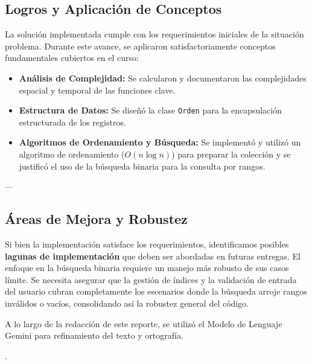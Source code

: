 \documentclass{article}
\begin{document}
\subsection{Logros y Aplicación de Conceptos}
La solución implementada cumple con los requerimientos iniciales de la situación problema. Durante este avance, se aplicaron satisfactoriamente conceptos fundamentales cubiertos en el curso:
\begin{itemize}
    \item \textbf{Análisis de Complejidad:} Se calcularon y documentaron las complejidades espacial y temporal de las funciones clave.
    \item \textbf{Estructura de Datos:} Se diseñó la clase \texttt{Orden} para la encapsulación estructurada de los registros.
    \item \textbf{Algoritmos de Ordenamiento y Búsqueda:} Se implementó y utilizó un algoritmo de ordenamiento ($O(n \log n)$) para preparar la colección y se justificó el uso de la búsqueda binaria para la consulta por rangos.
\end{itemize}

---

\subsection{Áreas de Mejora y Robustez}
Si bien la implementación satisface los requerimientos, identificamos posibles \textbf{lagunas de implementación} que deben ser abordadas en futuras entregas. El enfoque en la búsqueda binaria requiere un manejo más robusto de sus casos límite. Se necesita asegurar que la gestión de índices y la validación de entrada del usuario cubran completamente los escenarios donde la búsqueda arroje rangos inválidos o vacíos, consolidando así la robustez general del código.



\listoffigures


\printbibliography
A lo largo de la redacción de este reporte, se utilizó el Modelo de Lenguaje Gemini para refinamiento del texto y ortografía. 

\cite{Gemini}.
\end{document}
